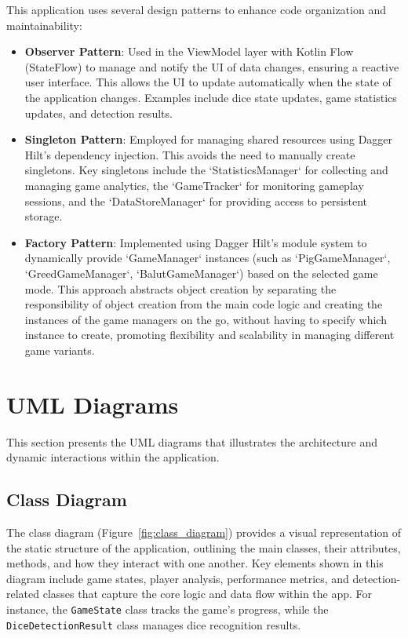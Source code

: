 This application uses several design patterns to enhance code organization and maintainability:

\begin{itemize}
    \item \textbf{Observer Pattern}: Used in the ViewModel layer with Kotlin Flow (StateFlow) to manage and notify the UI of data changes, ensuring a reactive user interface. This allows the UI to update automatically when the state of the application changes. Examples include dice state updates, game statistics updates, and detection results.
    
    \item \textbf{Singleton Pattern}: Employed for managing shared resources using Dagger Hilt's dependency injection. This avoids the need to manually create singletons. Key singletons include the `StatisticsManager` for collecting and managing game analytics, the `GameTracker` for monitoring gameplay sessions, and the `DataStoreManager` for providing access to persistent storage.

    \item \textbf{Factory Pattern}: Implemented using Dagger Hilt's module system to dynamically provide `GameManager` instances (such as `PigGameManager`, `GreedGameManager`, `BalutGameManager`) based on the selected game mode. This approach abstracts object creation by separating the responsibility of object creation from the main code logic and creating the instances of the game managers on the go, without having to specify which instance to create, promoting flexibility and scalability in managing different game variants.
\end{itemize}

\section{UML Diagrams}
\label{sec:uml}

This section presents the UML diagrams that illustrates the architecture and dynamic interactions within the application.

\subsection{Class Diagram}  
The class diagram (Figure~\ref{fig:class_diagram}) provides a visual representation of the static structure of the application, outlining the main classes, their attributes, methods, and how they interact with one another. Key elements shown in this diagram include game states, player analysis, performance metrics, and detection-related classes that capture the core logic and data flow within the app. For instance, the \texttt{GameState} class tracks the game's progress, while the \texttt{DiceDetectionResult} class manages dice recognition results.

